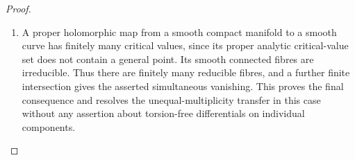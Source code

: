 \begin{proof}
\begin{enumerate}[label={$\langle1\rangle$\arabic*.},leftmargin=*]
\item A proper holomorphic map from a smooth compact manifold to a smooth curve has finitely many critical values, since its proper analytic critical-value set does not contain a general point. Its smooth connected fibres are irreducible. Thus there are finitely many reducible fibres, and a further finite intersection gives the asserted simultaneous vanishing. This proves the final consequence and resolves the unequal-multiplicity transfer in this case without any assertion about torsion-free differentials on individual components.

\end{enumerate}
\end{proof}

